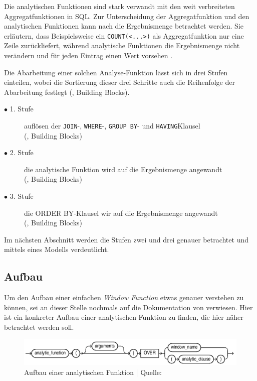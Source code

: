 Die analytischen Funktionen sind stark verwandt mit den weit verbreiteten Aggregatfunktionen
in SQL. Zur Unterscheidung der Aggregatfunktion und den analytischen Funktionen
kann nach \citet{Nuijten2023} die Ergebnismenge betrachtet werden. Sie erläutern,
dass Beispielsweise ein \texttt{COUNT(<...>)} als Aggregatfunktion nur eine
Zeile zurückliefert, während analytische Funktionen die Ergebnismenge nicht verändern
und für jeden Eintrag einen Wert vorsehen \citep{Nuijten2023}.

Die Abarbeitung einer solchen Analyse-Funktion lässt sich in drei Stufen
einteilen, wobei die Sortierung dieser drei Schritte auch die Reihenfolge der Abarbeitung
festlegt (\cite{Nuijten2023}, Building Blocks).
\begin{description}
	\item[$\bullet$ 1. Stufe] auflösen der \texttt{JOIN}-, \texttt{WHERE}-, \texttt{GROUP
		BY}- und \texttt{HAVING}Klausel \\ (\cite{Nuijten2023}, Building Blocks)

	\item[$\bullet$ 2. Stufe] die analytische Funktion wird auf die Ergebnismenge angewandt
		\\ (\cite{Nuijten2023}, Building Blocks)

	\item[$\bullet$ 3. Stufe] die ORDER BY-Klausel wir auf die Ergebnismenge angewandt
		\\ (\cite{Nuijten2023}, Building Blocks)
\end{description}
Im nächsten Abschnitt werden die Stufen zwei und drei genauer betrachtet und mittels
eines Modells verdeutlicht.

\subsection{Aufbau}
\label{sec:aufbau} Um den Aufbau einer einfachen \textit{Window Function} etwas
genauer verstehen zu können, sei an dieser Stelle nochmals auf die Dokumentation
von \citet{oracle} verwiesen. Hier ist ein konkreter Aufbau einer analytischen Funktion
zu finden, die hier näher betrachtet werden soll.

\begin{figure}[h]
	\centering
	\includegraphics[scale=0.5]{img/aufbauAnalyticFunction.jpg}
	\caption{ Aufbau einer analytischen Funktion | Quelle: \citep{oracle}}
	\label{fig:aufbauAnalyticFunction}
\end{figure}

